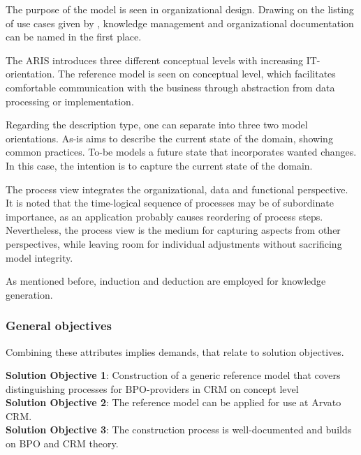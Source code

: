 The purpose of the model is seen in organizational design. Drawing on the listing of use cases given by \citep[]{Rosemann2012proc}, knowledge management and organizational documentation can be named in the first place. 

The \acrshort{ARIS} introduces three different conceptual levels with increasing IT-orientation. The reference model is seen on conceptual level, which facilitates comfortable communication with the business through abstraction from data processing or implementation.

Regarding the description type, one can separate into three two model orientations. As-is aims to describe the current state of the domain, \viz showing common practices. To-be models a future state that incorporates wanted changes. In this case, the intention is to capture the current state of the domain. 

The process view integrates the organizational, data and functional perspective. It is noted that the time-logical sequence of processes may be of subordinate importance, as an application probably causes reordering of process steps. Nevertheless, the process view is the medium for capturing aspects from other perspectives, while leaving room for individual adjustments without sacrificing model integrity. 

As mentioned before, induction and deduction are employed for knowledge generation.
 
\subsubsection{General objectives}
Combining these attributes implies demands, that relate to solution objectives.

\hfill\begin{minipage}{\dimexpr\textwidth-1.2cm}
	\textbf{Solution Objective 1}: Construction of a generic  reference model that covers distinguishing processes for BPO-providers in CRM on concept level
	\\
	
	\textbf{Solution Objective 2}: The reference model can be applied for use at Arvato CRM.  
	\\
	
	\textbf{Solution Objective 3}: The construction process is well-documented and builds on \acrshort{BPO} and \acrshort{CRM} theory.
	
	\xdef\tpd{\the\prevdepth}
\end{minipage}

